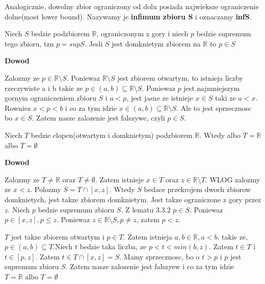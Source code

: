 \documentclass{article}
\begin{document}
Analogicznie, dowolny zbior ograniczony od dolu posiada najwieksze ograniczenie dolne(most lower bound). Nazywamy je \textbf{infimum zbioru S} i oznaczamy \textbf{infS}.

\begin{tcolorbox}[colback=white!90!green,colframe=black!35!green,title=3.3.2 Lemat:]

Niech $S$ bedzie podzbiorem $\mathbb{R}$, ograniczonym z gory i niech $p$ bedzie supremum tego zbioru, tzn $p = supS$. Jesli $S$ jest domknietym zbiorem na $\mathbb{R}$ to $p \in S$

\end{tcolorbox}

\textbf{Dowod}

Zalozmy ze $p\in \mathbb{R} \setminus S$. Poniewaz $\mathbb{R} \setminus S$ jest zbiorem otwartym, to istnieja liczby rzeczywiste a i b takie ze $p\in (a,b) \subseteq \mathbb{R} \setminus S$. Poniewaz $p$ jest najmniejszym gornym ograniczeniem zbioru $S$ i $a<p$, jest jasne ze istnieje $x \in S$ taki ze $a<x$. Rowniez $x<p<b$ i co za tym idzie $x \in (a,b) \subseteq \mathbb{R} \setminus S$. Ale to jest sprzecznosc bo $x\in S$. Zatem nasze zalozenie jest falszywe, czyli $p \in S$.

\begin{tcolorbox}[colback=white!90!green,colframe=black!35!green,title=3.3.3 Lemat: Clopen podzbior $\mathbb{R}$]

    Niech $T$ bedzie clopen(otwartym i domknietym) podzbiorem $\mathbb{R}$. Wtedy albo $T = \mathbb{R}$ albo $T = \emptyset$

\end{tcolorbox}

\textbf{Dowod}

Zalozmy ze $T \neq \mathbb{R}$ oraz $T \neq \emptyset$. Zatem istnieje $x \in T$ oraz $z \in \mathbb{R} \setminus T$. WLOG zalozmy ze $x<z$. Polozmy $S = T \cap [x,z]$. Wtedy $S$ bedace przekrojem dwoch zbiorow domknietych, jest takze zbiorem domknietym. Jest takze ograniczone z gory przez $z$. Niech $p$ bedzie supremum zbioru $S$. Z lematu 3.3.2 $p \in S$. Poniewaz $p \in [x,z], p\leq z$. Poniewaz $z \in \mathbb{R} \setminus S, p \neq z$, zatem $p<z$.

$T$ jest takze zbiorem otwartym i $p \in T$. Zatem istnieja $a,b \in \mathbb{R}, a<b$. takie ze, $p \in (a,b) \subseteq T$.Niech $t$ bedzie taka liczba, ze $p <t <min(b,z)$. Zatem $t \in T$ i $t \in [p,z]$. Zatem $t \in T\cap [x,z] = S$. Mamy sprzecznosc, bo o $t>p$ i $p$ jest supremum zbioru $S$. Zatem nasze zalozenie jest falszyew i co za tym idzie $T = \mathbb{R} \text{ albo } T = \emptyset$
\end{document}

